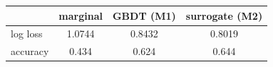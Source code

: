 \begin{tabular}{lccc}
\toprule
 & marginal & GBDT (M1) & surrogate (M2) \\
\midrule
log loss & 1.0744 & 0.8432 & 0.8019 \\
accuracy & 0.434 & 0.624 & 0.644 \\
\bottomrule
\end{tabular}
